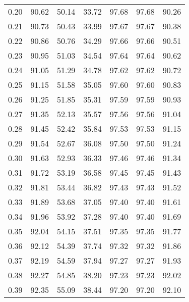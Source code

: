 \begin{tabular}{|c|c|c|c|c|c|c|}
      0.20 &     90.62 &     50.14 &      33.72 &   97.68 &      97.68 &         90.26 \\
      0.21 &     90.73 &     50.43 &      33.99 &   97.67 &      97.67 &         90.38 \\
      0.22 &     90.86 &     50.76 &      34.29 &   97.66 &      97.66 &         90.51 \\
      0.23 &     90.95 &     51.03 &      34.54 &   97.64 &      97.64 &         90.62 \\
      0.24 &     91.05 &     51.29 &      34.78 &   97.62 &      97.62 &         90.72 \\
      0.25 &     91.15 &     51.58 &      35.05 &   97.60 &      97.60 &         90.83 \\
      0.26 &     91.25 &     51.85 &      35.31 &   97.59 &      97.59 &         90.93 \\
      0.27 &     91.35 &     52.13 &      35.57 &   97.56 &      97.56 &         91.04 \\
      0.28 &     91.45 &     52.42 &      35.84 &   97.53 &      97.53 &         91.15 \\
      0.29 &     91.54 &     52.67 &      36.08 &   97.50 &      97.50 &         91.24 \\
      0.30 &     91.63 &     52.93 &      36.33 &   97.46 &      97.46 &         91.34 \\
      0.31 &     91.72 &     53.19 &      36.58 &   97.45 &      97.45 &         91.43 \\
      0.32 &     91.81 &     53.44 &      36.82 &   97.43 &      97.43 &         91.52 \\
      0.33 &     91.89 &     53.68 &      37.05 &   97.40 &      97.40 &         91.61 \\
      0.34 &     91.96 &     53.92 &      37.28 &   97.40 &      97.40 &         91.69 \\
      0.35 &     92.04 &     54.15 &      37.51 &   97.35 &      97.35 &         91.77 \\
      0.36 &     92.12 &     54.39 &      37.74 &   97.32 &      97.32 &         91.86 \\
      0.37 &     92.19 &     54.59 &      37.94 &   97.27 &      97.27 &         91.93 \\
      0.38 &     92.27 &     54.85 &      38.20 &   97.23 &      97.23 &         92.02 \\
      0.39 &     92.35 &     55.09 &      38.44 &   97.20 &      97.20 &         92.10 \\

\end{tabular}
